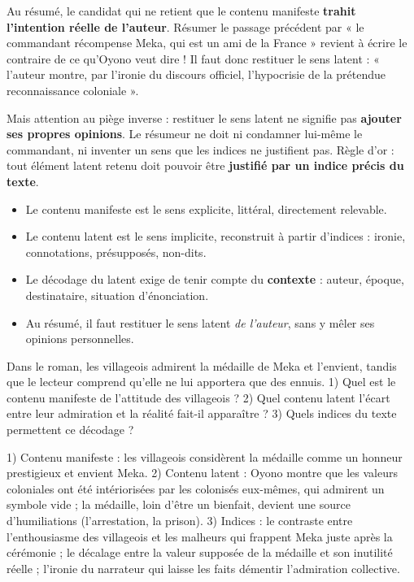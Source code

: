 \documentclass[11pt]{article}
\newcommand{\cle}[1]{{\popxbold\color{popdark}#1}}
\newcounter{popsec}
\newcounter{popsub}
\newcommand{\courssub}[1]{%
  \stepcounter{popsub}%
  \par\vspace{9pt}\noindent{\popxbold\fontsize{11.5}{13}\selectfont\color{popink}{\color{poporange}\thepopsec.\thepopsub}\hspace{6pt}#1}\par\nopagebreak\vspace{4pt}
}
\begin{document}
\courssub{Contenu latent et contraction de texte}

\begin{attention}
Au résumé, le candidat qui ne retient que le contenu manifeste \textbf{trahit l'intention réelle de l'auteur}. Résumer le passage précédent par « le commandant récompense Meka, qui est un ami de la France » revient à écrire le contraire de ce qu'Oyono veut dire ! Il faut donc restituer le sens latent : « l'auteur montre, par l'ironie du discours officiel, l'hypocrisie de la prétendue reconnaissance coloniale ».
\par Mais attention au piège inverse : restituer le sens latent ne signifie pas \textbf{ajouter ses propres opinions}. Le résumeur ne doit ni condamner lui-même le commandant, ni inventer un sens que les indices ne justifient pas. Règle d'or : tout élément latent retenu doit pouvoir être \textbf{justifié par un indice précis du texte}.
\end{attention}

\begin{aretenir}[L'essentiel]
\begin{itemize}
\item Le \cle{contenu manifeste} est le sens explicite, littéral, directement relevable.
\item Le \cle{contenu latent} est le sens implicite, reconstruit à partir d'indices : ironie, connotations, présupposés, non-dits.
\item Le décodage du latent exige de tenir compte du \textbf{contexte} : auteur, époque, destinataire, situation d'énonciation.
\item Au résumé, il faut restituer le sens latent \emph{de l'auteur}, sans y mêler ses opinions personnelles.
\end{itemize}
\end{aretenir}

\begin{exercice}[Entraînement]
Dans le roman, les villageois admirent la médaille de Meka et l'envient, tandis que le lecteur comprend qu'elle ne lui apportera que des ennuis. 1) Quel est le contenu manifeste de l'attitude des villageois ? 2) Quel contenu latent l'écart entre leur admiration et la réalité fait-il apparaître ? 3) Quels indices du texte permettent ce décodage ?
\end{exercice}

\begin{corrige}[Exercice 1]
1) Contenu manifeste : les villageois considèrent la médaille comme un honneur prestigieux et envient Meka. 2) Contenu latent : Oyono montre que les valeurs coloniales ont été intériorisées par les colonisés eux-mêmes, qui admirent un symbole vide ; la médaille, loin d'être un bienfait, devient une source d'humiliations (l'arrestation, la prison). 3) Indices : le contraste entre l'enthousiasme des villageois et les malheurs qui frappent Meka juste après la cérémonie ; le décalage entre la valeur supposée de la médaille et son inutilité réelle ; l'ironie du narrateur qui laisse les faits démentir l'admiration collective.
\end{corrige}
\end{document}

